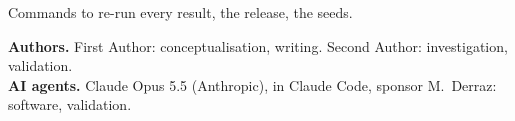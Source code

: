 \documentclass[draft]{coexist}
\begin{document}
\reproducibility
Commands to re-run every result, the release, the seeds.

\begin{contributions}
\textbf{Authors.} First Author: conceptualisation, writing. Second Author: investigation, validation.\\
\textbf{AI agents.} Claude Opus 5.5 (Anthropic), in Claude Code, sponsor M.~Derraz: software, validation.
\end{contributions}

\declarations


\nocite{cosmic-mass-lab}

\end{document}
